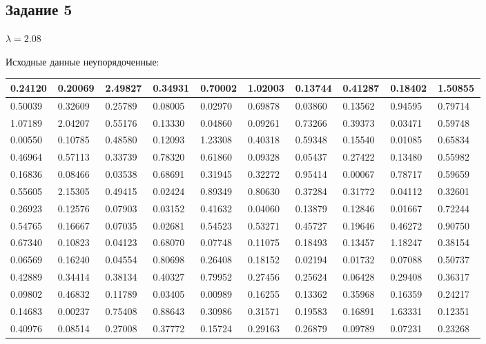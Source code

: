 \subsection{Задание 5}%
\label{subsec:5}%
$\lambda=2.08$

%
Исходные данные неупорядоченные:\newline%
\newline%
%
\begin{changemargin}{-4cm}{0cm}\small{%
\begin{tabular}{|p{0.08\linewidth}|p{0.08\linewidth}|p{0.08\linewidth}|p{0.08\linewidth}|p{0.08\linewidth}|p{0.08\linewidth}|p{0.08\linewidth}|p{0.08\linewidth}|p{0.08\linewidth}|p{0.08\linewidth}|}%
\hline%
0.24120&0.20069&2.49827&0.34931&0.70002&1.02003&0.13744&0.41287&0.18402&1.50855\\%
\hline%
0.50039&0.32609&0.25789&0.08005&0.02970&0.69878&0.03860&0.13562&0.94595&0.79714\\%
\hline%
1.07189&2.04207&0.55176&0.13330&0.04860&0.09261&0.73266&0.39373&0.03471&0.59748\\%
\hline%
0.00550&0.10785&0.48580&0.12093&1.23308&0.40318&0.59348&0.15540&0.01085&0.65834\\%
\hline%
0.46964&0.57113&0.33739&0.78320&0.61860&0.09328&0.05437&0.27422&0.13480&0.55982\\%
\hline%
0.16836&0.08466&0.03538&0.68691&0.31945&0.32272&0.95414&0.00067&0.78717&0.59659\\%
\hline%
0.55605&2.15305&0.49415&0.02424&0.89349&0.80630&0.37284&0.31772&0.04112&0.32601\\%
\hline%
0.26923&0.12576&0.07903&0.03152&0.41632&0.04060&0.13879&0.12846&0.01667&0.72244\\%
\hline%
0.54765&0.16667&0.07035&0.02681&0.54523&0.53271&0.45727&0.19646&0.46272&0.90750\\%
\hline%
0.67340&0.10823&0.04123&0.68070&0.07748&0.11075&0.18493&0.13457&1.18247&0.38154\\%
\hline%
0.06569&0.16240&0.04554&0.80698&0.26408&0.18152&0.02194&0.01732&0.07088&0.50737\\%
\hline%
0.42889&0.34414&0.38134&0.40327&0.79952&0.27456&0.25624&0.06428&0.29408&0.36317\\%
\hline%
0.09802&0.46832&0.11789&0.03405&0.00989&0.16255&0.13362&0.35968&0.16359&0.24217\\%
\hline%
0.14683&0.00237&0.75408&0.88643&0.30986&0.31571&0.19583&0.16891&1.63331&0.12351\\%
\hline%
0.40976&0.08514&0.27008&0.37772&0.15724&0.29163&0.26879&0.09789&0.07231&0.23268\\%

\end{tabular}}
\end{changemargin}
